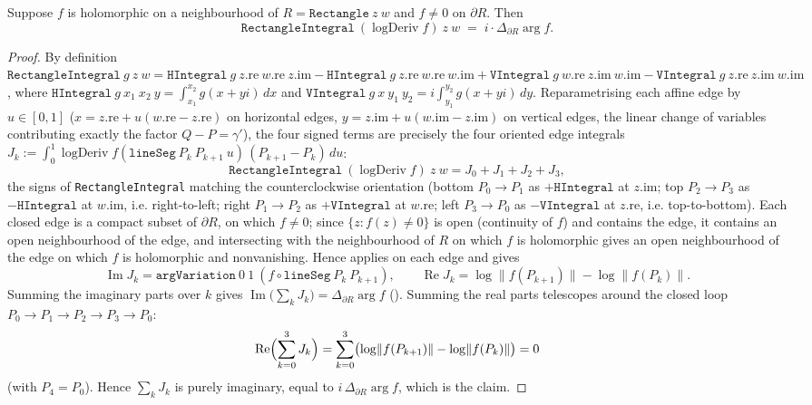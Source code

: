 \begin{lemma}
\label{lem:ap_integral_eq_argvar}
\leanok
{}
Suppose $f$ is holomorphic on a neighbourhood of $R=\texttt{Rectangle}\ z\ w$ and
$f\neq0$ on $\partial R$. Then
\[
  \texttt{RectangleIntegral}\ (\operatorname{logDeriv} f)\ z\ w
  \;=\; i\cdot \Delta_{\partial R}\arg f .
\]
\end{lemma}

\begin{proof}
\leanok
{}
By definition
$\texttt{RectangleIntegral}\ g\ z\ w
=\texttt{HIntegral}\ g\ z.\mathrm{re}\ w.\mathrm{re}\ z.\mathrm{im}
-\texttt{HIntegral}\ g\ z.\mathrm{re}\ w.\mathrm{re}\ w.\mathrm{im}
+\texttt{VIntegral}\ g\ w.\mathrm{re}\ z.\mathrm{im}\ w.\mathrm{im}
-\texttt{VIntegral}\ g\ z.\mathrm{re}\ z.\mathrm{im}\ w.\mathrm{im}$,
where $\texttt{HIntegral}\ g\ x_1\ x_2\ y=\int_{x_1}^{x_2} g(x+yi)\,dx$ and
$\texttt{VIntegral}\ g\ x\ y_1\ y_2=i\int_{y_1}^{y_2} g(x+yi)\,dy$. Reparametrising
each affine edge by $u\in[0,1]$ ($x=z.\mathrm{re}+u(w.\mathrm{re}-z.\mathrm{re})$ on
horizontal edges, $y=z.\mathrm{im}+u(w.\mathrm{im}-z.\mathrm{im})$ on vertical edges,
the linear change of variables contributing exactly the factor $Q-P=\gamma'$), the
four signed terms are precisely the four oriented edge integrals
$J_k:=\int_0^1 \operatorname{logDeriv} f(\texttt{lineSeg}\ P_k\ P_{k+1}\ u)\,(P_{k+1}-P_k)\,du$:
\[
  \texttt{RectangleIntegral}\ (\operatorname{logDeriv} f)\ z\ w
  = J_0 + J_1 + J_2 + J_3 ,
\]
the signs of \texttt{RectangleIntegral} matching the counterclockwise orientation
(bottom $P_0\to P_1$ as $+\texttt{HIntegral}$ at $z.\mathrm{im}$; top $P_2\to P_3$ as
$-\texttt{HIntegral}$ at $w.\mathrm{im}$, i.e. right-to-left; right $P_1\to P_2$ as
$+\texttt{VIntegral}$ at $w.\mathrm{re}$; left $P_3\to P_0$ as $-\texttt{VIntegral}$
at $z.\mathrm{re}$, i.e. top-to-bottom). Each closed edge is a compact subset of
$\partial R$, on which $f\neq0$; since $\{z:f(z)\neq0\}$ is open (continuity of $f$)
and contains the edge, it contains an open neighbourhood of the edge, and
intersecting with the neighbourhood of $R$ on which $f$ is holomorphic gives an open
neighbourhood of the edge on which $f$ is holomorphic and nonvanishing. Hence
 applies on each edge and gives
\[
  \operatorname{Im} J_k = \texttt{argVariation}\ 0\ 1\ (f\circ\texttt{lineSeg}\ P_k\ P_{k+1}),
  \qquad
  \operatorname{Re} J_k = \log\lVert f(P_{k+1})\rVert-\log\lVert f(P_k)\rVert .
\]
Summing the imaginary parts over $k$ gives $\operatorname{Im}\bigl(\sum_k
J_k\bigr)=\Delta_{\partial R}\arg f$ (). Summing the real
parts telescopes around the closed loop $P_0\to P_1\to P_2\to P_3\to P_0$:
\[
  \operatorname{Re}\Bigl(\sum_{k=0}^{3} J_k\Bigr)
  = \sum_{k=0}^{3}\bigl(\log\lVert f(P_{k+1})\rVert-\log\lVert f(P_k)\rVert\bigr) = 0
\]
(with $P_4=P_0$). Hence $\sum_k J_k$ is purely imaginary, equal to
$i\,\Delta_{\partial R}\arg f$, which is the claim.
\end{proof}

